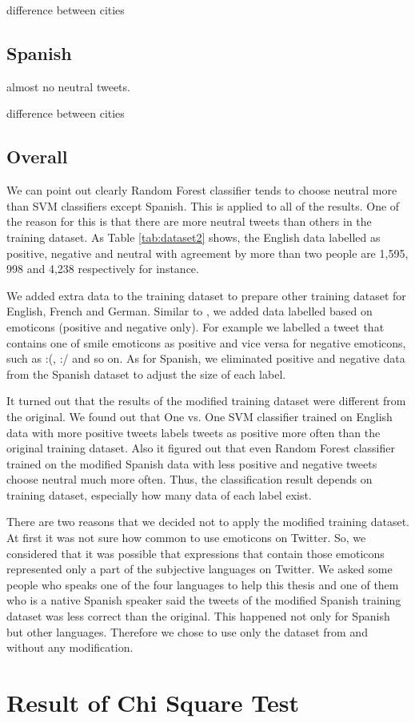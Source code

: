difference between cities
\subsection{Spanish}
almost no neutral tweets.

difference between cities

\subsection{Overall}\label{sec:discussion_overall}
We can point out clearly Random Forest classifier tends to choose neutral more than SVM classifiers except Spanish.
This is applied to all of the results.
One of the reason for this is that there are more neutral tweets than others in the training dataset.
As Table \ref{tab:dataset2} shows, the English data labelled as positive, negative and neutral with agreement by more than two people are 1,595, 998 and 4,238 respectively for instance.

We added extra data to the training dataset to prepare other training dataset for English, French and German.
Similar to \cite{dataset}, we added data labelled based on emoticons (positive and negative only).
For example we labelled a tweet that contains one of smile emoticons as positive and vice versa for negative emoticons, such as :(, :/ and so on.
As for Spanish, we eliminated positive and negative data from the Spanish dataset to adjust the size of each label. 

It turned out that the results of the modified training dataset were different from the original.
We found out that One vs. One SVM classifier trained on English data with more positive tweets labels tweets as positive more often than the original training dataset. 
Also it figured out that even Random Forest classifier trained on the modified Spanish data with less positive and negative tweets choose neutral much more often.
Thus, the classification result depends on training dataset, especially how many data of each label exist.

There are two reasons that we decided not to apply the modified training dataset.
At first it was not sure how common to use emoticons on Twitter.
So, we considered that it was possible that expressions that contain those emoticons represented only a part of the subjective languages on Twitter.
We asked some people who speaks one of the four languages to help this thesis and one of them who is a native Spanish speaker said the tweets of the modified Spanish training dataset was less correct than the original. 
This happened not only for Spanish but other languages.
Therefore we chose to use only the dataset from \cite{dataset} and \cite{dataset_spanish} without any modification.




\section{Result of Chi Square Test}

